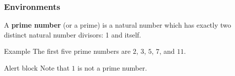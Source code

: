 \documentclass[pdflatex,compress]{beamer}
\begin{document}
\begin{frame}
\frametitle{Environments}

\begin{definition}
A \textbf{prime number} (or a prime) is a natural number which has exactly two distinct natural number divisors: 1 and itself.
\end{definition}

\begin{exampleblock}{Example}
The first five prime numbers are $2$, $3$, $5$, $7$, and $11$.
\end{exampleblock}

\begin{alertblock}{Alert block}
Note that $1$ is not a prime number.
\end{alertblock}

\end{frame}
\end{document}
